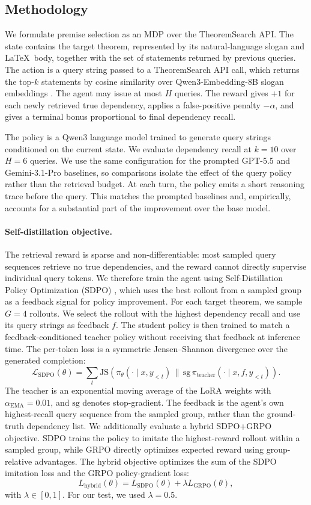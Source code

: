 \subsection{Methodology}
We formulate premise selection as an MDP over the TheoremSearch API. The state contains the target theorem, represented by its natural-language slogan and \LaTeX\ body, together with the set of statements returned by previous queries. The action is a query string passed to a TheoremSearch API call, which returns the top-$k$ statements by cosine similarity over Qwen3-Embedding-8B slogan embeddings \cite{zhang2025qwen3embedding}. The agent may issue at most $H$ queries. The reward gives $+1$ for each newly retrieved true dependency, applies a false-positive penalty $-\alpha$, and gives a terminal bonus proportional to final dependency recall.

The policy is a Qwen3 language model trained to generate query strings conditioned on the current state. We evaluate dependency recall at $k{=}10$ over $H{=}6$ queries. We use the same configuration for the prompted GPT-5.5 and Gemini-3.1-Pro baselines, so comparisons isolate the effect of the query policy rather than the retrieval budget. At each turn, the policy emits a short reasoning trace before the query. This matches the prompted baselines and, empirically, accounts for a substantial part of the improvement over the base model.

\paragraph{Self-distillation objective.} The retrieval reward is sparse and non-differentiable: most sampled query sequences retrieve no true dependencies, and the reward cannot directly supervise individual query tokens. We therefore train the agent using Self-Distillation Policy Optimization (SDPO) \cite{hubotter2026sdpo}, which uses the best rollout from a sampled group as a feedback signal for policy improvement. For each target theorem, we sample $G{=}4$ rollouts. We select the rollout with the highest dependency recall and use its query strings as feedback $f$. The student policy is then trained to match a feedback-conditioned teacher policy without receiving that feedback at inference time. The per-token loss is a symmetric Jensen--Shannon divergence over the generated completion:
\[
	\mathcal{L}_{\text{SDPO}}(\theta)=\sum_t \mathrm{JS}\!\left(\pi_\theta(\cdot\mid x,y_{<t})\,\|\,
	\mathrm{sg}\,\pi_{\text{teacher}}(\cdot\mid x,f,y_{<t})\right).
\]
The teacher is an exponential moving average of the LoRA weights with $\alpha_{\text{EMA}}{=}0.01$, and $\mathrm{sg}$ denotes stop-gradient. The feedback is the agent's own highest-recall query sequence from the sampled group, rather than the ground-truth dependency list. We additionally evaluate a hybrid SDPO+GRPO objective. SDPO trains the policy to imitate the
highest-reward rollout within a sampled group, while GRPO directly optimizes expected reward using group-relative advantages. The hybrid objective optimizes the sum of the SDPO imitation loss and the GRPO policy-gradient loss:
\[
L_{\text{hybrid}}(\theta)
=
L_{\text{SDPO}}(\theta)
+
\lambda L_{\text{GRPO}}(\theta),
\]
with $\lambda \in [0,1]$. For our test, we used $\lambda = 0.5$.

